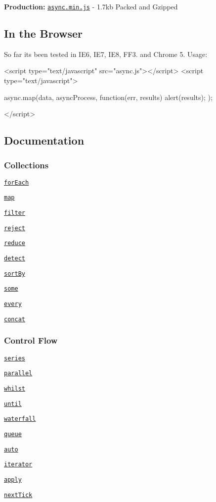 {\bfseries Production\+:} \href{https://github.com/caolan/async/raw/master/dist/async.min.js}{\tt async.\+min.\+js} -\/ 1.\+7kb Packed and Gzipped

\subsection*{In the Browser}

So far its been tested in I\+E6, I\+E7, I\+E8, F\+F3. and Chrome 5. Usage\+: \begin{DoxyVerb}<script type="text/javascript" src="async.js"></script>
<script type="text/javascript">

    async.map(data, asyncProcess, function(err, results){
        alert(results);
    });

</script>
\end{DoxyVerb}


\subsection*{Documentation}

\subsubsection*{Collections}


\begin{DoxyItemize}
\item \href{#forEach}{\tt for\+Each}
\item \href{#map}{\tt map}
\item \href{#filter}{\tt filter}
\item \href{#reject}{\tt reject}
\item \href{#reduce}{\tt reduce}
\item \href{#detect}{\tt detect}
\item \href{#sortBy}{\tt sort\+By}
\item \href{#some}{\tt some}
\item \href{#every}{\tt every}
\item \href{#concat}{\tt concat}
\end{DoxyItemize}

\subsubsection*{Control Flow}


\begin{DoxyItemize}
\item \href{#series}{\tt series}
\item \href{#parallel}{\tt parallel}
\item \href{#whilst}{\tt whilst}
\item \href{#until}{\tt until}
\item \href{#waterfall}{\tt waterfall}
\item \href{#queue}{\tt queue}
\item \href{#auto}{\tt auto}
\item \href{#iterator}{\tt iterator}
\item \href{#apply}{\tt apply}
\item \href{#nextTick}{\tt next\+Tick}
\end{DoxyItemize}


